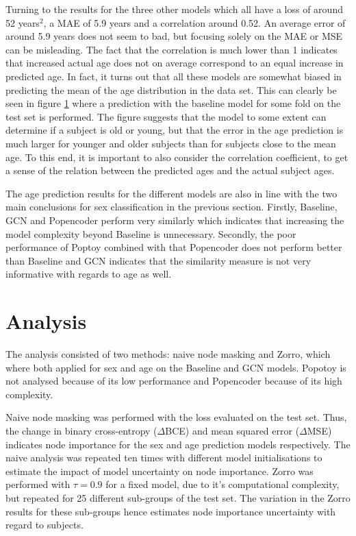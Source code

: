Turning to the results for the three other models which all have a loss of around
52 years$^2$, a MAE of 5.9 years and a correlation around 0.52. An average error of around 5.9 years does not seem to bad, but focusing solely on the MAE or MSE can be misleading. The fact that the correlation is much lower than 1 indicates that increased actual age does not on average correspond to an equal increase in predicted age. In fact, it turns out that all these models are somewhat biased in predicting the mean of the age distribution in the data set. This can clearly be seen in figure \ref{} where a prediction with the baseline model for some fold on the test set is performed. The figure suggests that the model to some extent can determine if a subject is old or young, but that the error in the age prediction is much larger for younger and older subjects than for subjects close to the mean age. To this end, it is important to also consider the correlation coefficient, to get a sense of the relation between the predicted ages and the actual subject ages. 

The age prediction results for the different models are also in line with the two main conclusions for sex classification in the previous section. Firstly, Baseline, GCN and Popencoder perform very similarly which indicates that increasing the model complexity beyond Baseline is unnecessary. Secondly, the poor performance of Poptoy combined with that Popencoder does not perform better than Baseline and GCN indicates that the similarity  measure is not very informative with regards to age as well. 




\section{Analysis}
The analysis consisted of two methods: naive node masking and Zorro, which where both applied for sex and age on the Baseline and GCN models. Popotoy is not analysed because of its low performance and Popencoder because of its high complexity.

Naive node masking was performed with the loss evaluated on the test set. Thus, the change in binary cross-entropy ($\Delta$BCE) and mean squared error ($\Delta$MSE) indicates node importance for the sex and age prediction models respectively. The naive analysis was repeated ten times with different model initialisations to estimate the impact of model uncertainty on node importance. Zorro was performed with $\tau=0.9$ for a fixed model, due to it's computational complexity, but repeated for 25 different sub-groups of the test set. The variation in the Zorro results for these sub-groups hence estimates node importance uncertainty with regard to subjects. 


